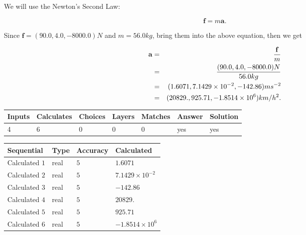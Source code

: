 \documentclass[12pt]{article}
\begin{document}
 

We will use the Newton's Second Law:
 
\[
\mathbf{f}=m\mathbf{a}.
\]
 
Since $\mathbf{f}=( %
90.0,  %
4.0,  %
-8000.0 )N$
and $m= %
56.0 kg$, bring them into the above equation, then we get
 
\begin{eqnarray*}
\mathbf{a}&=&\frac{\mathbf{f}}m  \\
&=&\frac{(
90.0 ,
4.0 ,
-8000.0 )N
}{ %
56.0 kg}  \\
&=&(
1.6071 ,
7.1429 \times 10^{-2},
-142.86
)ms^{-2} \\
&=&(
20829. ,
925.71 ,
-1.8514 \times 10^{6}
)km/h^2.
\end{eqnarray*}
 
 
 
\noindent{}
 
 

 
\vspace{0.3in}
   
   
   
   
\noindent\begin{tabular}{|l|l|l|l|l|l|l|}
 \hline
Inputs & Calculates & Choices & Layers & Matches & Answer & Solution \\ \hline
           4 & 
           6 & 
           0
  & 
           0 & 
           0 & 
  yes & 
  yes 
  \\ \hline
 \end{tabular}
   
   
   
   
\noindent{}
   
   
  
  
\noindent\begin{tabular}{|l|l|l|l|}
\hline
 Sequential & Type & Accuracy & Calculated \\ 
\hline
 
 
  Calculated $           1$ & real & $           5 $ & 
 $ 1.6071 $ 
 \\  \hline  
 
 
  Calculated $           2$ & real & $           5 $ & 
 $ 7.1429 \times 10^{-2} $ 
 \\  \hline  
 
 
  Calculated $           3$ & real & $           5 $ & 
 $ -142.86 $ 
 \\  \hline  
 
 
  Calculated $           4$ & real & $           5 $ & 
 $ 20829. $ 
 \\  \hline  
 
 
  Calculated $           5$ & real & $           5 $ & 
 $ 925.71 $ 
 \\  \hline  
 
 
  Calculated $           6$ & real & $           5 $ & 
 $ -1.8514 \times 10^{6} $ 
 \\  \hline  
 \end{tabular}
   
\end{document}

